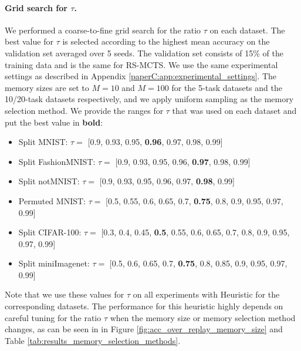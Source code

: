 \paragraph{Grid search for $\tau$.} We performed a coarse-to-fine grid search for the ratio $\tau$ on each dataset. The best value for $\tau$ is selected according to the highest mean accuracy on the validation set averaged over 5 seeds. The validation set consists of 15\% of the training data and is the same for RS-MCTS. We use the same experimental settings as described in Appendix \ref{paperC:app:experimental_settings}. The memory sizes are set to $M=10$ and $M=100$ for the 5-task datasets and the 10/20-task datasets respectively, and we apply uniform sampling as the memory selection method. We provide the ranges for $\tau$ that was used on each dataset and put the best value in \textbf{bold}:
\begin{itemize}[topsep=1pt]
    \item Split MNIST: $\tau =$ [0.9, 0.93, 0.95, \textbf{0.96}, 0.97, 0.98, 0.99]
    \item Split FashionMNIST: $\tau =$ [0.9, 0.93, 0.95, 0.96, \textbf{0.97}, 0.98, 0.99]
    \item Split notMNIST: $\tau =$ [0.9, 0.93, 0.95, 0.96, 0.97, \textbf{0.98}, 0.99]
    \item Permuted MNIST: $\tau =$ [0.5, 0.55, 0.6, 0.65, 0.7, \textbf{0.75}, 0.8, 0.9, 0.95, 0.97, 0.99]
    \item Split CIFAR-100: $\tau =$ [0.3, 0.4, 0.45, \textbf{0.5}, 0.55, 0.6, 0.65, 0.7, 0.8, 0.9, 0.95, 0.97, 0.99]
    \item  Split miniImagenet: $\tau =$ [0.5, 0.6, 0.65, 0.7, \textbf{0.75}, 0.8, 0.85, 0.9, 0.95, 0.97, 0.99]
\end{itemize}
Note that we use these values for $\tau$ on all experiments with Heuristic for the corresponding datasets. The performance for this heuristic highly depends on careful tuning for the ratio $\tau$ when the memory size or memory selection method changes, as can be seen in in Figure \ref{fig:acc_over_replay_memory_size} and Table \ref{tab:results_memory_selection_methods}. 

